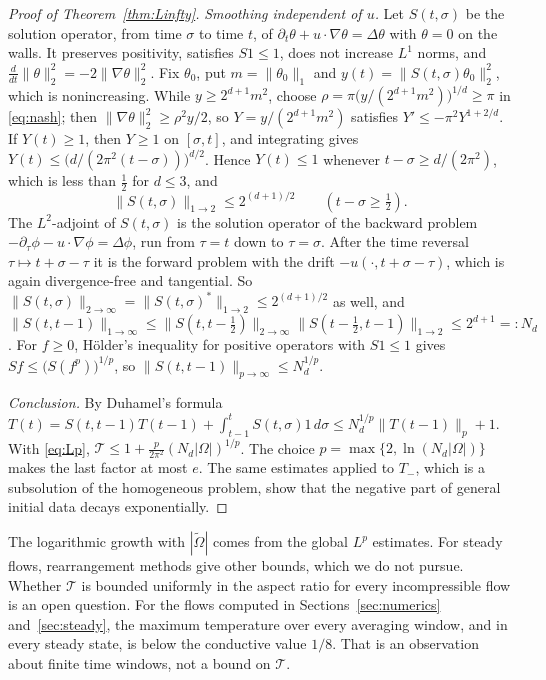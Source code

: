 \begin{proof}[Proof of Theorem~\ref{thm:Linfty}]
\emph{Smoothing independent of $u$.} Let $S(t,\sigma)$ be the solution operator, from time $\sigma$ to time $t$, of
$\partial_t\theta+u\cdot\nabla\theta=\Delta\theta$ with $\theta=0$ on the walls. It preserves positivity, satisfies
$S1\le1$, does not increase $L^1$ norms, and $\frac d{dt}\|\theta\|_2^2=-2\|\nabla\theta\|_2^2$. Fix $\theta_0$, put
$m=\|\theta_0\|_1$ and $y(t)=\|S(t,\sigma)\theta_0\|_2^2$, which is nonincreasing. While $y\ge2^{d+1}m^2$, choose
$\rho=\pi\big(y/(2^{d+1}m^2)\big)^{1/d}\ge\pi$ in \eqref{eq:nash}; then $\|\nabla\theta\|_2^2\ge\rho^2y/2$, so
$Y=y/(2^{d+1}m^2)$ satisfies $Y'\le-\pi^2Y^{1+2/d}$. If $Y(t)\ge1$, then $Y\ge1$ on $[\sigma,t]$, and integrating
gives $Y(t)\le\big(d/(2\pi^2(t-\sigma))\big)^{d/2}$. Hence $Y(t)\le1$ whenever $t-\sigma\ge d/(2\pi^2)$, which is less
than $\frac12$ for $d\le3$, and
\[
\|S(t,\sigma)\|_{1\to2}\le2^{(d+1)/2}\qquad(t-\sigma\ge\tfrac12).
\]
The $L^2$-adjoint of $S(t,\sigma)$ is the solution operator of the backward problem $-\partial_\tau\phi-u\cdot\nabla\phi
=\Delta\phi$, run from $\tau=t$ down to $\tau=\sigma$. After the time reversal $\tau\mapsto t+\sigma-\tau$ it is the
forward problem with the drift $-u(\cdot,t+\sigma-\tau)$, which is again divergence-free and tangential. So
$\|S(t,\sigma)\|_{2\to\infty}=\|S(t,\sigma)^*\|_{1\to2}\le2^{(d+1)/2}$ as well, and
$\|S(t,t-1)\|_{1\to\infty}\le\|S(t,t-\frac12)\|_{2\to\infty}\|S(t-\frac12,t-1)\|_{1\to2}\le2^{d+1}=:N_d$. For
$f\ge0$, Hölder's inequality for positive operators with $S1\le1$ gives $Sf\le\big(S(f^p)\big)^{1/p}$, so
$\|S(t,t-1)\|_{p\to\infty}\le N_d^{1/p}$.

\emph{Conclusion.} By Duhamel's formula
$T(t)=S(t,t-1)T(t-1)+\int_{t-1}^tS(t,\sigma)1\,d\sigma\le N_d^{1/p}\|T(t-1)\|_p+1$. With \eqref{eq:Lp},
$\mathcal T\le1+\frac p{2\pi^2}(N_d|\Omega|)^{1/p}$. The choice $p=\max\{2,\ln(N_d|\Omega|)\}$ makes the last factor at
most $e$. The same estimates applied to $T_-$, which is a subsolution of the homogeneous problem, show that the
negative part of general initial data decays exponentially.
\end{proof}

The logarithmic growth with $|\tilde\Omega|$ comes from the global $L^p$ estimates. For steady flows,
rearrangement methods \citep{Talenti1976,IyerEtAl2010} give other bounds, which we do not pursue. Whether
$\mathcal T$ is bounded uniformly in the aspect ratio for every incompressible flow is an open question. For the
flows computed in Sections~\ref{sec:numerics} and~\ref{sec:steady}, the maximum temperature over every averaging
window, and in every steady state, is below the conductive value $1/8$. That is an observation about finite time
windows, not a bound on $\mathcal T$.


